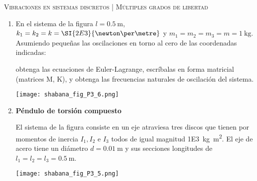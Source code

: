 \documentclass[11pt, spanish, a4paper, twopage]{article}
\begin{document}
\begin{center}
	\textsc{\large Vibraciones en sistemas discretos | Múltiples grados de libertad}
\end{center}


\begin{enumerate}

				
\item 
\begin{minipage}[t][4cm]{0.65\textwidth}
En el sistema de la figura \(l = \SI{0.5}{\metre}\), \(k_1 = k_2 = k = \SI{2E3}{\newton\per\metre}\) y \(m_1 = m_2 = m_3 = m = \SI{1}{\kilo\gram}\).
Asumiendo pequeñas las oscilaciones en torno al cero de las coordenadas indicadas:
\begin{tasks}
	\task obtenga las ecuaciones de Euler-Lagrange,
	\task escríbalas en forma matricial (matrices M, K), y
	\task obtenga las frecuencias naturales de oscilación del sistema.
\end{tasks}
\end{minipage}
\begin{minipage}[c][0cm][t]{0.3\textwidth}
	\texttt{[image: shabana\_fig\_P3\_6.png]}
\end{minipage}



\item 
\begin{minipage}[t][2.5cm]{0.65\textwidth}
\textbf{Péndulo de torsión compuesto}

El sistema de la figura consiste en un eje atraviesa tres discos que tienen por momentos de inercia \(I_1, I_2\) e \(I_3\) todos de igual magnitud \SI{1E3}{\kilo\gram\metre\squared}.
El eje de acero tiene un diámetro \(d = \SI{0.01}{\metre}\) y sus secciones longitudes de \(l_1 = l_2 = l_3 = \SI{0.5}{\metre}\).
\end{minipage}
\begin{minipage}[c][1cm][t]{0.3\textwidth}
	\texttt{[image: shabana\_fig\_P3\_5.png]}
\end{minipage}



\end{enumerate}
\end{document}
